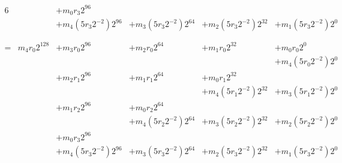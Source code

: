 \documentclass[12pt]{article}
\begin{document}
\begin{alignat*}{6}
    &                   & + m_{0}r_{3}2^{96} \\
    &                   & + m_{4}(5r_{3}2^{-2})2^{96} & + m_{3}(5r_{3}2^{-2})2^{64} & + m_{2}(5r_{3}2^{-2})2^{32}   & + m_{1}(5r_{3}2^{-2})2^0 \\
    \\ \\
   =
      & m_{4}r_{0}2^{128} & + m_{3}r_{0}2^{96}          & + m_{2}r_{0}2^{64}          & + m_{1}r_{0}2^{32}            & + m_{0}r_{0}2^0 \\
      &                   &                             &                             &                               & + m_{4}(5r_{0}2^{-2})2^0 \\
      &                   & + m_{2}r_{1}2^{96}          & + m_{1}r_{1}2^{64}          & + m_{0}r_{1}2^{32}  \\
      &                   &                             &                             & + m_{4}(5r_{1}2^{-2})2^{32}   & + m_{3}(5r_{1}2^{-2})2^0\\
      &                   & + m_{1}r_{2}2^{96}          & + m_{0}r_{2}2^{64}  \\
      &                   &                             & + m_{4}(5r_{2}2^{-2})2^{64} & + m_{3}(5r_{2}2^{-2})2^{32}   & + m_{2}(5r_{2}2^{-2})2^0 \\
      &                   & + m_{0}r_{3}2^{96} \\
      &                   & + m_{4}(5r_{3}2^{-2})2^{96} & + m_{3}(5r_{3}2^{-2})2^{64} & + m_{2}(5r_{3}2^{-2})2^{32}   & + m_{1}(5r_{3}2^{-2})2^0 \\
\end{alignat*}
\end{document}
